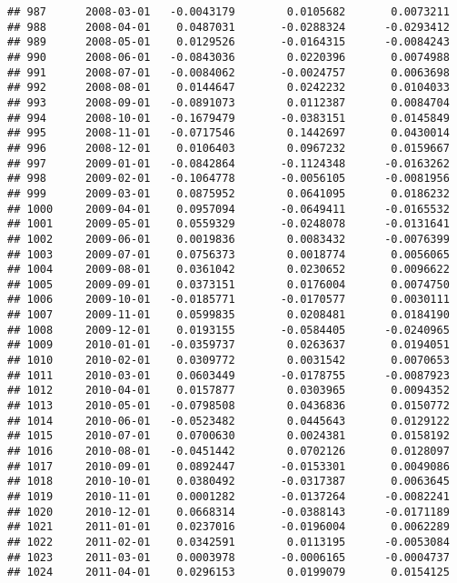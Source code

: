 \documentclass[
]{article}
\begin{document}
\begin{verbatim}
## 987      2008-03-01   -0.0043179        0.0105682       0.0073211
## 988      2008-04-01    0.0487031       -0.0288324      -0.0293412
## 989      2008-05-01    0.0129526       -0.0164315      -0.0084243
## 990      2008-06-01   -0.0843036        0.0220396       0.0074988
## 991      2008-07-01   -0.0084062       -0.0024757       0.0063698
## 992      2008-08-01    0.0144647        0.0242232       0.0104033
## 993      2008-09-01   -0.0891073        0.0112387       0.0084704
## 994      2008-10-01   -0.1679479       -0.0383151       0.0145849
## 995      2008-11-01   -0.0717546        0.1442697       0.0430014
## 996      2008-12-01    0.0106403        0.0967232       0.0159667
## 997      2009-01-01   -0.0842864       -0.1124348      -0.0163262
## 998      2009-02-01   -0.1064778       -0.0056105      -0.0081956
## 999      2009-03-01    0.0875952        0.0641095       0.0186232
## 1000     2009-04-01    0.0957094       -0.0649411      -0.0165532
## 1001     2009-05-01    0.0559329       -0.0248078      -0.0131641
## 1002     2009-06-01    0.0019836        0.0083432      -0.0076399
## 1003     2009-07-01    0.0756373        0.0018774       0.0056065
## 1004     2009-08-01    0.0361042        0.0230652       0.0096622
## 1005     2009-09-01    0.0373151        0.0176004       0.0074750
## 1006     2009-10-01   -0.0185771       -0.0170577       0.0030111
## 1007     2009-11-01    0.0599835        0.0208481       0.0184190
## 1008     2009-12-01    0.0193155       -0.0584405      -0.0240965
## 1009     2010-01-01   -0.0359737        0.0263637       0.0194051
## 1010     2010-02-01    0.0309772        0.0031542       0.0070653
## 1011     2010-03-01    0.0603449       -0.0178755      -0.0087923
## 1012     2010-04-01    0.0157877        0.0303965       0.0094352
## 1013     2010-05-01   -0.0798508        0.0436836       0.0150772
## 1014     2010-06-01   -0.0523482        0.0445643       0.0129122
## 1015     2010-07-01    0.0700630        0.0024381       0.0158192
## 1016     2010-08-01   -0.0451442        0.0702126       0.0128097
## 1017     2010-09-01    0.0892447       -0.0153301       0.0049086
## 1018     2010-10-01    0.0380492       -0.0317387       0.0063645
## 1019     2010-11-01    0.0001282       -0.0137264      -0.0082241
## 1020     2010-12-01    0.0668314       -0.0388143      -0.0171189
## 1021     2011-01-01    0.0237016       -0.0196004       0.0062289
## 1022     2011-02-01    0.0342591        0.0113195      -0.0053084
## 1023     2011-03-01    0.0003978       -0.0006165      -0.0004737
## 1024     2011-04-01    0.0296153        0.0199079       0.0154125

\end{verbatim}
\end{document}

